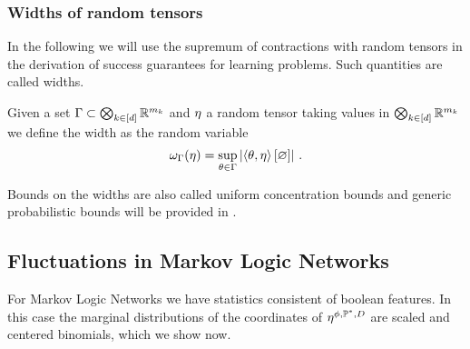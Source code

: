 \subsubsection{Widths of random tensors}

In the following we will use the supremum of contractions with random tensors in the derivation of success guarantees for learning problems.
Such quantities are called widths.

\begin{definition}
	Given a set $\Gamma\subset\bigotimes_{k\in[d]} \mathbb{R}^{m_{k}}$ and $\eta$ a random tensor taking values in $\bigotimes_{k\in[d]} \mathbb{R}^{m_{k}}$ we define the width as the random variable
		\[ \omega_{\Gamma}(\eta) = \sup_{\theta\in\Gamma} \left|\left\langle \theta,\eta\right\rangle \left[ \varnothing \right]\right| \, . \]	
\end{definition}


Bounds on the widths are also called uniform concentration bounds \cite{goessman_uniform_2021} and generic probabilistic bounds will be provided in .





\subsection{Fluctuations in Markov Logic Networks}


For Markov Logic Networks we have statistics consistent of boolean features.
In this case the marginal distributions of the coordinates of $\eta^{\phi,\mathbb{P}^*,D}$ are scaled and centered binomials, which we show now.

